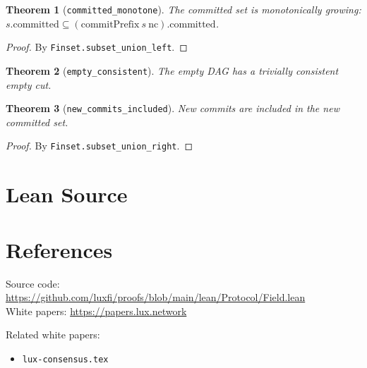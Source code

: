 \documentclass[11pt]{article}
\newtheorem{theorem}{Theorem}
\begin{document}
\begin{theorem}[\texttt{committed\_monotone}]
The committed set is monotonically growing: $s.\text{committed} \subseteq (\text{commitPrefix}~s~\text{nc}).\text{committed}$.
\end{theorem}
\begin{proof}
By \texttt{Finset.subset\_union\_left}.
\end{proof}

\begin{theorem}[\texttt{empty\_consistent}]
The empty DAG has a trivially consistent empty cut.
\end{theorem}

\begin{theorem}[\texttt{new\_commits\_included}]
New commits are included in the new committed set.
\end{theorem}
\begin{proof}
By \texttt{Finset.subset\_union\_right}.
\end{proof}


\section{Lean Source}


\section{References}
\noindent Source code: \url{https://github.com/luxfi/proofs/blob/main/lean/Protocol/Field.lean}\\
\noindent White papers: \url{https://papers.lux.network}

\noindent Related white papers:
\begin{itemize}
  \item \texttt{lux-consensus.tex}
\end{itemize}
\end{document}
